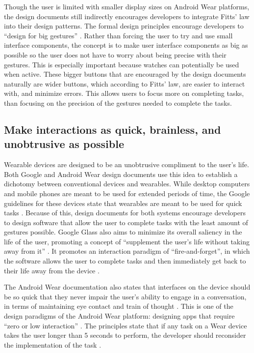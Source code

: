 \documentclass[12pt]{article}
\begin{document}
Though the user is limited with smaller display sizes on Android Wear platforms, the design documents still indirectly encourages developers to integrate Fitts' law into their design patterns. The formal design principles encourage developers to ``design for big gestures'' \cite{andr}. Rather than forcing the user to try and use small interface components, the concept is to make user interface components as big as possible so the user does not have to worry about being precise with their gestures. This is especially important because watches can potentially be used when active. These bigger buttons that are encouraged by the design documents naturally are wider buttons, which according to Fitts' law, are easier to interact with, and minimize errors. This allows users to focus more on completing tasks, than focusing on the precision of the gestures needed to complete the tasks. 

\subsection{Make interactions as quick, brainless, and unobtrusive as possible}
Wearable devices are designed to be an unobtrusive compliment to the user's life. Both Google and Android Wear design documents use this idea to establish a dichotomy between conventional devices and wearables. While desktop computers and mobile phones are meant to be used for extended periods of time, the Google guidelines for these devices state that wearables are meant to be used for quick tasks \cite{andr} \cite{goog}. Because of this, design documents for both systems encourage developers to design software that allow the user to complete tasks with the least amount of gestures possible. Google Glass also aims to minimize its overall saliency in the life of the user, promoting a concept of ``supplement the user's life without taking away from it'' \cite{goog}. It promotes an interaction paradigm of ``fire-and-forget'', in which the software allows the user to complete tasks and then immediately get back to their life away from the device \cite{goog}.

The Android Wear documentation also states that interfaces on the device should be so quick that they never impair the user's ability to engage in a conversation, in terms of maintaining eye contact and train of thought \cite{andr}. This is one of the design paradigms of the Android Wear platform: designing apps that require ``zero or low interaction'' \cite{andr2}. The principles state that if any task on a Wear device takes the user longer than 5 seconds to perform, the developer should reconsider the implementation of the task \cite{andr}.
\end{document}
